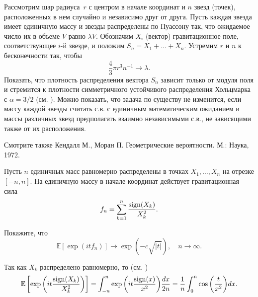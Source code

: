 \begin{problem} Рассмотрим шар \mbox{радиуса $r$} с центром в начале координат и $n$ звезд (точек), расположенных в нем случайно и независимо друг от друга. Пусть каждая звезда имеет единичную массу и звезды распределены по Пуассону так, что ожидаемое число их в объеме $V$ равно $\lambda V$. Обозначим $X_{i}$ (вектор) гравитационное поле, соответствующее $i$-й звезде, и положим $S_{n} =X_{1} +...+X_{n} $. Устремим $r$ и $n$ к бесконечности так, чтобы $$\frac{4}{3} \pi r^{3} n^{-1} \to \lambda.$$ Показать, что плотность распределения вектора $S_{n}$ зависит только от модуля поля и стремится к плотности симметричного устойчивого распределения Хольцмарка с $\alpha = 3/2$ (см. \cite{28}). Можно показать, что задача по существу не изменится, если массу каждой звезды считать с.в. с единичным математическим ожиданием и массы различных звезд предполагать взаимно независимыми с.в., не зависящими также от их расположения.
\end{problem}
\begin{remark}
Смотрите также Кендалл М., Моран П. Геометрические вероятности. М.: Наука, 1972.


\end{remark}


\begin{problem} Пусть $n$ единичных масс равномерно распределены в точках $X_1, \ldots, X_n$ на отрезке $[-n, n]$. На единичную массу в начале координат действует гравитационная сила $$f_n = \sum_{k =1}^n \frac{{\rm sign}(X_k)}{X_k^2}.$$ 


Покажите, что $$\mathbb{E}\left[\exp{\left(it f_n\right)}\right] \rightarrow \exp{\left(-c\sqrt{|t|}\right)}, \quad n\to\infty.$$
\end{problem}
\begin{ordre}
Так как $X_k$ распределено равномерно, то (см. \cite{2013})
\begin{equation*}
\mathbb{E}\left[\exp{\left(it \frac{{\rm sign}(X_k)}{X_k^2}\right) }\right] = \int_{-n}^n \exp{\left(it\frac{{\rm sign}(x)}{x^2}\right) }\frac{dx}{2n} = \frac{1}{n}\int_{0}^n \cos{\left(\frac{t}{x^2}\right)}dx.
\end{equation*}
\end{ordre}

